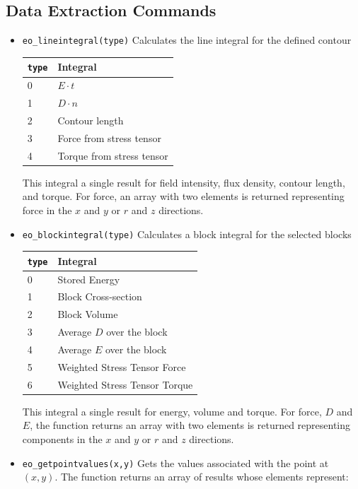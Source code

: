 \subsection{Data Extraction Commands}
\begin{itemize}

\item \texttt{eo\_lineintegral(type)} Calculates the line integral for the defined contour

\begin{tabular}{ll}
\texttt{type} & Integral \\ \hline
 0 & $E \cdot t$ \\
 1 & $D \cdot n$ \\
 2 & Contour length \\
 3 & Force from stress tensor \\
 4 & Torque from stress tensor
\end{tabular}

This integral a single result for field intensity, flux density, contour length, and torque.  For force, an array with
two elements is returned representing force in the $x$ and $y$ or $r$ and $z$ directions.

\item \texttt{eo\_blockintegral(type)} Calculates a block integral for the selected
blocks

\begin{tabular}{ll}
\texttt{type} & Integral \\ \hline
 0 & Stored Energy \\
 1 & Block Cross-section \\
 2 & Block Volume \\
 3 & Average $D$ over the block \\
 4 & Average $E$ over the block \\
 5 & Weighted Stress Tensor Force \\
 6 & Weighted Stress Tensor Torque
\end{tabular}

This integral a single result for energy, volume and torque. For force, $D$ and $E$, the function returns an array with
two elements is returned representing components in the $x$ and $y$ or $r$ and $z$ directions.

\item \texttt{eo\_getpointvalues(x,y)} Gets the values associated with the point at
$(x,y)$.  The function returns an array of results whose elements represent:


\end{itemize}
